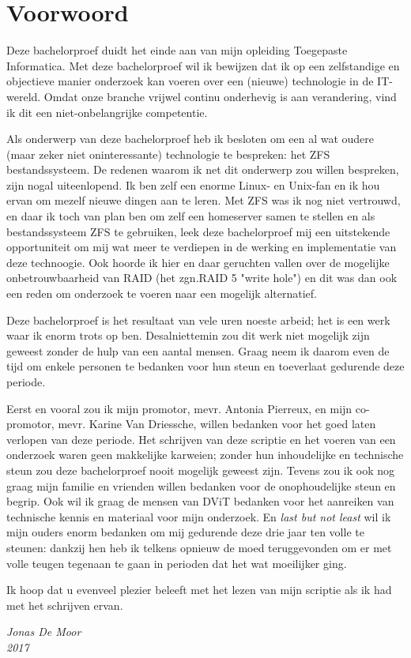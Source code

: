 
\chapter*{Voorwoord}
\label{ch:voorwoord}


Deze bachelorproef duidt het einde aan van mijn opleiding Toegepaste Informatica. Met deze bachelorproef wil ik bewijzen dat ik op een zelfstandige en objectieve manier onderzoek kan voeren over een (nieuwe) technologie in de IT-wereld. Omdat onze branche vrijwel continu onderhevig is aan verandering, vind ik dit een niet-onbelangrijke competentie. 

Als onderwerp van deze bachelorproef heb ik besloten om een al wat oudere (maar zeker niet oninteressante) technologie te bespreken: het ZFS bestandssysteem. De redenen waarom ik net dit onderwerp zou willen bespreken, zijn nogal uiteenlopend. Ik ben zelf een enorme Linux- en Unix-fan en ik hou ervan om mezelf nieuwe dingen aan te leren. Met ZFS was ik nog niet vertrouwd, en daar ik toch van plan ben om zelf een homeserver samen te stellen en als bestandssysteem ZFS te gebruiken, leek deze bachelorproef mij een uitstekende opportuniteit om mij wat meer te verdiepen in de werking en implementatie van deze technoogie. Ook hoorde ik hier en daar geruchten vallen over de mogelijke onbetrouwbaarheid van RAID (het zgn.RAID 5 "write hole") en dit was dan ook een reden om onderzoek te voeren naar een mogelijk alternatief.

Deze bachelorproef is het resultaat van vele uren noeste arbeid; het is een werk waar ik enorm trots op ben. Desalniettemin zou dit werk niet mogelijk zijn geweest zonder de hulp van een aantal mensen. Graag neem ik daarom even de tijd om enkele personen te bedanken voor hun steun en toeverlaat gedurende deze periode. 

Eerst en vooral zou ik mijn promotor, mevr. Antonia Pierreux, en mijn co-promotor, mevr. Karine Van Driessche, willen bedanken voor het goed laten verlopen van deze periode. Het schrijven van deze scriptie en het voeren van een onderzoek waren geen makkelijke karweien; zonder hun inhoudelijke en technische steun zou deze bachelorproef nooit mogelijk geweest zijn. Tevens zou ik ook nog graag mijn familie en vrienden willen bedanken voor de onophoudelijke steun en begrip. Ook wil ik graag de mensen van DViT bedanken voor het aanreiken van technische kennis en materiaal voor mijn onderzoek. En \textit{last but not least} wil ik mijn ouders enorm bedanken om mij gedurende deze drie jaar ten volle te steunen: dankzij hen heb ik telkens opnieuw de moed teruggevonden om er met volle teugen tegenaan te gaan in perioden dat het wat moeilijker ging.

Ik hoop dat u evenveel plezier beleeft met het lezen van mijn scriptie als ik had met het schrijven ervan.

\begin{flushright}
  \textit{Jonas De Moor} \\
  \textit{2017}
\end{flushright}
